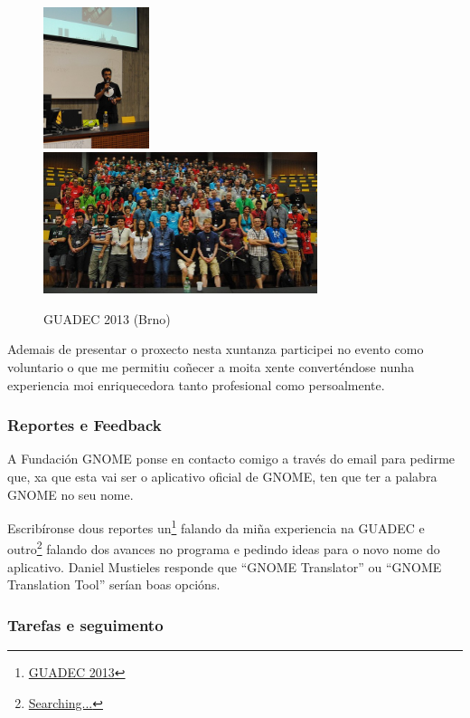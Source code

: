 \begin{figure}[h!]
    \centering
    \includegraphics[width=0.275\textwidth]{img/guadec_2013_1.jpg}
    \includegraphics[width=0.715\textwidth]{img/guadec_2013_2.jpg}
    \caption{GUADEC 2013 (Brno)}
    \label{fig:guadec2012}
\end{figure}

Ademais de presentar o proxecto nesta xuntanza participei no evento como voluntario o que me permitiu coñecer a moita xente converténdose nunha experiencia moi enriquecedora tanto profesional como persoalmente.

\subsubsection{Reportes e Feedback}

A Fundación GNOME ponse en contacto comigo a través do email para pedirme que, xa que esta vai ser o aplicativo oficial de GNOME, ten que ter a palabra GNOME no seu nome.

Escribíronse dous reportes un\footnote{\href{http://aquelando.info/guadec-2013/}{GUADEC 2013}} falando da miña experiencia na GUADEC e outro\footnote{\href{http://aquelando.info/searching/}{Searching...}} falando dos avances no programa e pedindo ideas para o novo nome do aplicativo. Daniel Mustieles responde que ``GNOME Translator'' ou ``GNOME Translation Tool'' serían boas opcións.

\subsubsection{Tarefas e seguimento}

